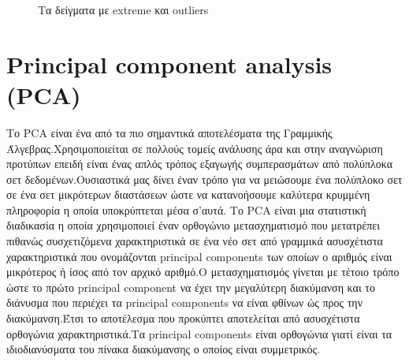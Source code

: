   \begin{figure}[h!]
	\centering
	\caption{Τα δείγματα με extreme και outliers}
\end{figure}
 \section { Principal component analysis (PCA)}
 
 Το PCA είναι ένα από τα πιο σημαντικά αποτελέσματα της Γραμμικής Άλγεβρας.Χρησιμοποιείται σε πολλούς τομείς ανάλυσης άρα και στην αναγνώριση προτύπων επειδή είναι ένας απλός τρόπος εξαγωγής συμπερασμάτων από πολύπλοκα σετ δεδομένων.Ουσιαστικά μας δίνει έναν τρόπο για να μειώσουμε ένα πολύπλοκο σετ σε ένα σετ μικρότερων διαστάσεων ώστε να κατανοήσουμε καλύτερα κρυμμένη πληροφορία η οποία υποκρύπτεται μέσα σ'αυτά.
Το PCA είναι μια στατιστική διαδικασία η οποία χρησιμοποιεί έναν ορθογώνιο μετασχηματισμό που μετατρέπει πιθανώς συσχετιζόμενα χαρακτηριστικά σε ένα νέο σετ από γραμμικά ασυσχέτιστα χαρακτηριστικά που ονομάζονται principal components των οποίων ο αριθμός είναι μικρότερος ή ίσος από τον αρχικό αριθμό.Ο μετασχηματισμός γίνεται με τέτοιο τρόπο ώστε το πρώτο principal component να έχει την μεγαλύτερη διακύμανση και το διάνυσμα που περιέχει τα principal components να είναι φθίνων ώς προς την διακύμανση.Έτσι το αποτέλεσμα που προκύπτει αποτελείται από ασυσχέτιστα ορθογώνια χαρακτηριστικά.Τα principal components είναι ορθογώνια γιατί είναι τα ιδιοδιανύσματα του πίνακα διακύμανσης ο οποίος είναι συμμετρικός.

